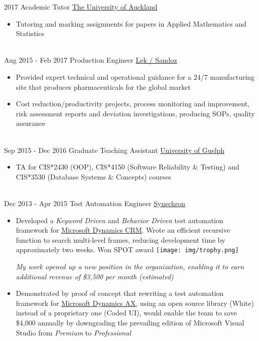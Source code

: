 \documentclass[letterpaper]{twentysecondcv} %
\begin{document}
\begin{twenty} %
\twentyitem
    	{2017}
		{}
        {Academic Tutor}
        {\href{https://www.auckland.ac.nz/en.html}{The University of Auckland}}
        {}
        {\begin{itemize}
        \item Tutoring and marking assignments for papers in Applied Mathematics and Statistics
        \end{itemize}}
        \\
	\twentyitem
    	{Aug 2015 -}
		{Feb 2017}
        {Production Engineer}
        {\href{https://www.lek.si/en/}{Lek / Sandoz}}
        {}
        {
        {\begin{itemize}
        \item Provided expert technical and operational guidance for a 24/7 manufacturing site that produces pharmaceuticals for the global market
        \item Cost reduction/productivity projects, process monitoring and improvement, risk assessment reports and deviation investigations, producing SOPs, quality assurance
    \end{itemize}}
        }
    \\   
    \twentyitem
   		{Sep 2015 -}
		{Dec 2016}
        {Graduate Teaching Assistant}
        {\href{http://www.uoguelph.ca}{University of Guelph}}
        {}
        {
        {\begin{itemize}
        \item TA for CIS*2430 (OOP), CIS*4150 (Software Reliability \& Testing) and CIS*3530 (Database Systems \& Concepts) courses
    \end{itemize}}
        }
     \\
     \twentyitem
   		{Dec 2013 -}
		{Apr 2015}
        {Test Automation Engineer}
        {\href{http://www.synechron.com/}{Synechron}}
        {}
        {
        \begin{itemize}
        \item Developed a \textit{Keyword Driven} and \textit{Behavior Driven} test automation framework for \href{https://www.microsoft.com/en-ca/dynamics/crm.aspx}{Microsoft Dynamics CRM}. Wrote an efficient recursive function to search multi-level frames, reducing development time by approximately two weeks. Won SPOT award {\texttt{[image: img/trophy.png]}}
        
        \textit{My work opened up a new position in the organization, enabling it to earn additional revenue of \$3,500 per month (estimated)}
        \item Demonstrated by proof of concept that rewriting a test automation framework for \href{https://www.microsoft.com/en-ca/dynamics/erp-ax-overview.aspx}{Microsoft Dynamics AX}, using an open source library (White) instead of a proprietary one (Coded UI), would enable the team to save \$4,000 annually by downgrading the prevailing edition of Microsoft Visual Studio from \textit{Premium} to \textit{Professional}
    \end{itemize}
    	}
        
\end{twenty}
\end{document}
